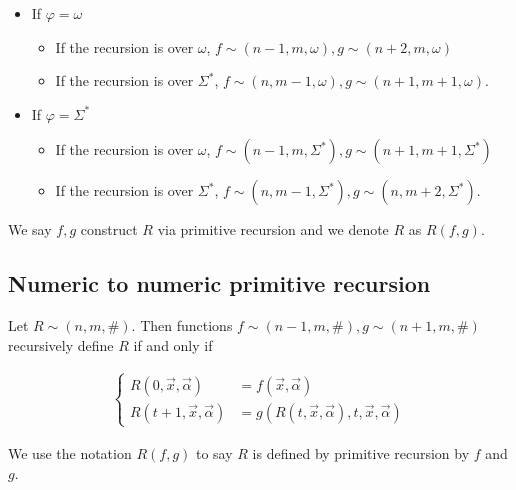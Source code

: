 \documentclass[a4paper, 12pt]{article}
\begin{document}
\begin{itemize}
    \item If $\varphi = \omega$ 
        \begin{itemize}
            \item If the recursion is over $\omega$, $f \sim (n - 1, m, \omega),
                g \sim (n + 2, m, \omega)$
            \item If the recursion is over $\Sigma^{*}$, $f \sim (n, m - 1,
                \omega), g \sim (n + 1, m + 1, \omega)$.
        \end{itemize}
    \item If $\varphi = \Sigma^{*}$ 
        \begin{itemize}
            \item If the recursion is over $\omega$, $f \sim (n - 1, m, \Sigma^{*}),
                g \sim (n + 1, m + 1, \Sigma^{*})$
            \item If the recursion is over $\Sigma^{*}$, $f \sim (n, m - 1,
                \Sigma^{*}), g \sim (n, m + 2, \Sigma^{*})$.
        \end{itemize}
\end{itemize}

We say $f, g$ construct $R$ via primitive recursion and we denote $R$ as $R(f,
g)$.

\subsection{Numeric to numeric primitive recursion}

Let $R \sim (n, m, \#)$. Then functions $f \sim (n - 1, m, \#), g \sim (n + 1,
m, \#)$ recursively define $R$ if and only if 

\begin{align*}
\begin{cases}
    R(0, \overrightarrow{x}, \overrightarrow{\alpha}) &= f(
        \overrightarrow{x}, \overrightarrow{\alpha}) \\
    R(t + 1, \overrightarrow{x}, \overrightarrow{\alpha}) &= g \left( R(t,
        \overrightarrow{x}, \overrightarrow{\alpha}), t, \overrightarrow{x},
    \overrightarrow{\alpha} \right)
\end{cases}
\end{align*}

We use the notation $R(f, g)$ to say $R$ is defined by primitive recursion by
$f$ and $g$.
\end{document}

